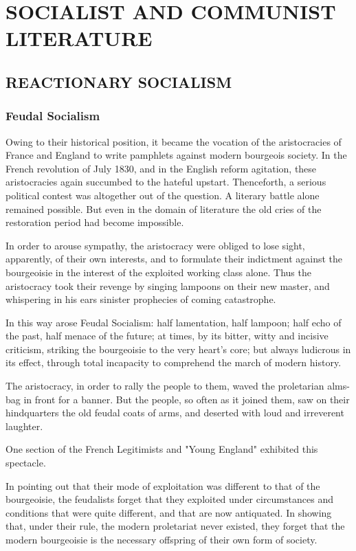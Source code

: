 \documentclass[, oneside]{article}   	%
\begin{document}
\section{SOCIALIST AND COMMUNIST LITERATURE}
\subsection{REACTIONARY SOCIALISM}
\subsubsection{Feudal Socialism}
Owing to their historical position, it became the vocation of the aristocracies of France and England to write pamphlets against modern bourgeois society. In the French revolution of July 1830, and in the English reform agitation, these aristocracies again succumbed to the hateful upstart. Thenceforth, a serious political contest was altogether out of the question. A literary battle alone remained possible. But even in the domain of literature the old cries of the restoration period had become impossible.

In order to arouse sympathy, the aristocracy were obliged to lose sight, apparently, of their own interests, and to formulate their indictment against the bourgeoisie in the interest of the exploited working class alone. Thus the aristocracy took their revenge by singing lampoons on their new master, and whispering in his ears sinister prophecies of coming catastrophe.

In this way arose Feudal Socialism: half lamentation, half lampoon; half echo of the past, half menace of the future; at times, by its bitter, witty and incisive criticism, striking the bourgeoisie to the very heart's core; but always ludicrous in its effect, through total incapacity to comprehend the march of modern history.

The aristocracy, in order to rally the people to them, waved the proletarian alms-bag in front for a banner. But the people, so often as it joined them, saw on their hindquarters the old feudal coats of arms, and deserted with loud and irreverent laughter.

One section of the French Legitimists and "Young England" exhibited this spectacle.

In pointing out that their mode of exploitation was different to that of the bourgeoisie, the feudalists forget that they exploited under circumstances and conditions that were quite different, and that are now antiquated. In showing that, under their rule, the modern proletariat never existed, they forget that the modern bourgeoisie is the necessary offspring of their own form of society.
\end{document}
